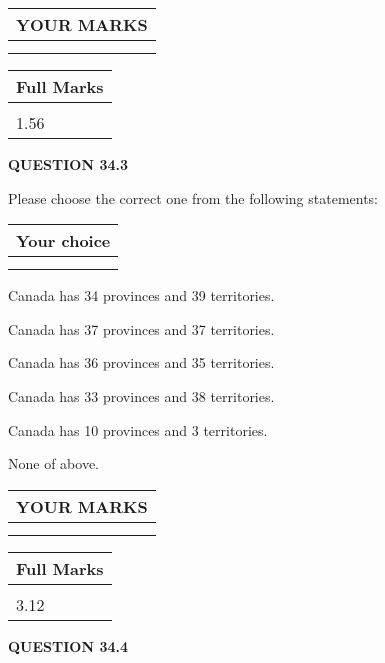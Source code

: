 \documentclass[12pt]{article}
\begin{document}
 
\vspace{0.3in}
  
\vspace{0.2in}
  
\noindent\begin{tabular}{|l|}
\hline
 YOUR MARKS  \\
\hline
 \\ 
 \\ 
\hline
\end{tabular}
\hspace{0.05in} \begin{tabular}{|l|}
\hline
 Full Marks  \\
\hline
 \\ 
1.56 \\
\hline
\end{tabular}
{\textbf{\Large{QUESTION
34.3 
}}}
  
  
Please choose the correct one from the following statements:
  
  
\noindent\hspace{3.0in} \begin{tabular}{|l|}
\hline
Your choice \\
\hline
 \\ 
 \\ 
\hline
\end{tabular}
  
  
 
 
Canada has  %
34 provinces and  %
39 territories.
 
 
Canada has  %
37 provinces and  %
37 territories.
 
 
Canada has  %
36 provinces and  %
35 territories.
 
 
Canada has  %
33 provinces and  %
38 territories.
 
 
Canada has  %
10 provinces and  %
3 territories.
 
 
 None of above.
 
 
  
\vspace{0.2in}
  
\noindent\begin{tabular}{|l|}
\hline
 YOUR MARKS  \\
\hline
 \\ 
 \\ 
\hline
\end{tabular}
\hspace{0.05in} \begin{tabular}{|l|}
\hline
 Full Marks  \\
\hline
 \\ 
3.12 \\
\hline
\end{tabular}
{\textbf{\Large{QUESTION
34.4 
}}}
  
\end{document}
